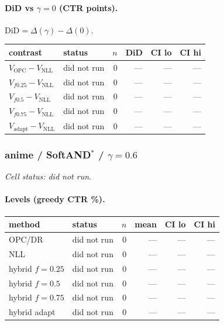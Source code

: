 \documentclass[10pt,a4paper]{article}
\begin{document}
\paragraph{DiD vs $\gamma=0$ (CTR points).} $\mathrm{DiD}=\Delta(\gamma)-\Delta(0)$.
{\centering\small\begin{tabular}{llrrrr}
\toprule contrast & status & $n$ & DiD & CI lo & CI hi \\
\midrule
$V_{\mathrm{OPC}}-V_{\mathrm{NLL}}$ & did not run & 0 & --- & --- & --- \\
$V_{f0.25}-V_{\mathrm{NLL}}$ & did not run & 0 & --- & --- & --- \\
$V_{f0.5}-V_{\mathrm{NLL}}$ & did not run & 0 & --- & --- & --- \\
$V_{f0.75}-V_{\mathrm{NLL}}$ & did not run & 0 & --- & --- & --- \\
$V_{\mathrm{adapt}}-V_{\mathrm{NLL}}$ & did not run & 0 & --- & --- & --- \\
\bottomrule\end{tabular}\par}
\bigskip
\subsubsection{anime / SoftAND$^*$ / $\gamma=0.6$}
\emph{Cell status: did not run}.
\paragraph{Levels (greedy CTR \%).}
{\centering\small\begin{tabular}{llrrrr}
\toprule method & status & $n$ & mean & CI lo & CI hi \\
\midrule
OPC/DR & did not run & 0 & --- & --- & --- \\
NLL & did not run & 0 & --- & --- & --- \\
hybrid $f{=}0.25$ & did not run & 0 & --- & --- & --- \\
hybrid $f{=}0.5$ & did not run & 0 & --- & --- & --- \\
hybrid $f{=}0.75$ & did not run & 0 & --- & --- & --- \\
hybrid adapt & did not run & 0 & --- & --- & --- \\
\bottomrule\end{tabular}\par}
\end{document}
